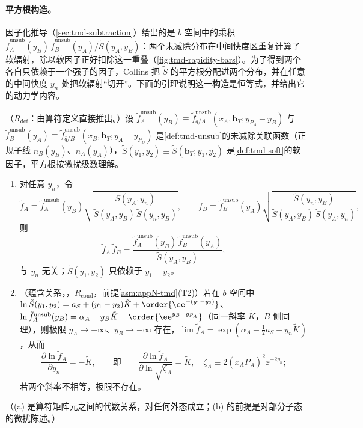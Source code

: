 \paragraph{平方根构造。}因子化推导（\cref{sec:tmd-subtraction}）给出的是 $b$ 空间中的乘积 $\tilde f_A^{\mathrm{unsub}}(y_B)\,\tilde f_B^{\mathrm{unsub}}(y_A)/\tilde S(y_A,y_B)$：两个未减除分布在中间快度区重复计算了软辐射，除以软因子正好扣除这一重叠（\cref{fig:tmd-rapidity-bars}）。为了得到两个各自只依赖于一个强子的因子，Collins 把 $\tilde S$ 的平方根分配进两个分布，并在任意的中间快度 $y_n$ 处把软辐射“切开”。下面的引理说明这一构造是恒等式，并给出它的动力学内容。

\begin{lemma}\label{lem:tmd-sqrt-identity}
（$R_{\mathrm{def}}$：由算符定义直接推出。）设 $\tilde f_A^{\mathrm{unsub}}(y_B)\equiv\tilde f^{\mathrm{unsub}}_{q/A}(x_A,\mathbf b_T;y_{P_A}-y_B)$ 与 $\tilde f_B^{\mathrm{unsub}}(y_A)\equiv\tilde f^{\mathrm{unsub}}_{\bar q/B}(x_B,\mathbf b_T;y_A-y_{P_B})$ 是\cref{def:tmd-unsub}的未减除关联函数（正规子线 $n_B(y_B)$、$n_A(y_A)$），$\tilde S(y_1,y_2)\equiv\tilde S(\mathbf b_T;y_1,y_2)$ 是\cref{def:tmd-soft}的软因子，平方根按微扰级数理解。
\begin{enumerate}[label=(\alph*),leftmargin=2.2em,itemsep=1pt,topsep=2pt]
\item 对任意 $y_n$，令
\begin{equation}\label{eq:tmd-sqrt-def}
\tilde f_A\equiv\tilde f_A^{\mathrm{unsub}}(y_B)\sqrt{\frac{\tilde S(y_A,y_n)}{\tilde S(y_A,y_B)\,\tilde S(y_n,y_B)}},\qquad
\tilde f_B\equiv\tilde f_B^{\mathrm{unsub}}(y_A)\sqrt{\frac{\tilde S(y_n,y_B)}{\tilde S(y_A,y_B)\,\tilde S(y_A,y_n)}},
\end{equation}
则
\begin{equation}\label{eq:tmd-sqrt-identity}
\tilde f_A\,\tilde f_B=\frac{\tilde f_A^{\mathrm{unsub}}(y_B)\,\tilde f_B^{\mathrm{unsub}}(y_A)}{\tilde S(y_A,y_B)},
\end{equation}
与 $y_n$ 无关；$\tilde S(y_1,y_2)$ 只依赖于 $y_1-y_2$。
\item（蕴含关系，\tagR，$R_{\mathrm{cond}}$，前提\cref{asm:appN-tmd}(T2)）若在 $b$ 空间中 $\ln\tilde S(y_1,y_2)=a_S+(y_1-y_2)\tilde K+\order{\ee^{-(y_1-y_2)}}$、$\ln\tilde f_A^{\mathrm{unsub}}(y_B)=\alpha_A-y_B\tilde K+\order{\ee^{y_B-y_{P_A}}}$（同一斜率 $\tilde K$，$B$ 侧同理），则极限 $y_A\to+\infty$、$y_B\to-\infty$ 存在，$\lim\tilde f_A=\exp(\alpha_A-\frac12a_S-y_n\tilde K)$，从而
\begin{equation}\label{eq:tmd-CS-from-sqrt}
\frac{\partial\ln\tilde f_A}{\partial y_n}=-\tilde K,\qquad\text{即}\qquad\frac{\partial\ln\tilde f_A}{\partial\ln\sqrt{\zeta_A}}=\tilde K,\quad \zeta_A\equiv2(x_AP_A^+)^2\ee^{-2y_n};
\end{equation}
若两个斜率不相等，极限不存在。
\end{enumerate}
（(a) 是算符矩阵元之间的代数关系，对任何外态成立；(b) 的前提是对部分子态的微扰陈述。）
\end{lemma}

